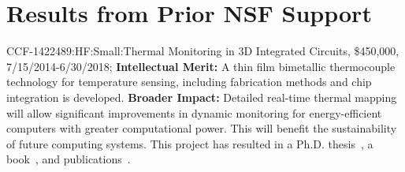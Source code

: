\section{Results from Prior NSF Support}

 CCF-1422489:HF:Small:Thermal Monitoring in 3D Integrated Circuits, \$450,000, 7/15/2014-6/30/2018; 
{\bf Intellectual Merit:} A thin film bimetallic thermocouple technology for temperature sensing, including fabrication methods and chip integration is developed. {\bf Broader Impact:} Detailed real-time thermal mapping will allow significant improvements in dynamic monitoring for energy-efficient computers with greater computational power. This will benefit the sustainability of future computing systems. This project has resulted in a Ph.D. thesis~\cite{daweiThesis}, a book~\cite{Memik2016HeatMI}, and publications~\cite{LiTVLSI,LiDAC2017,LiISCAS}.

